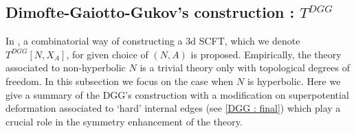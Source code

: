 \documentclass[a4paper,11pt]{article}
\begin{document}
\subsection{Dimofte-Gaiotto-Gukov's construction : $T^{DGG}$}\label{sec:DGG}
In \cite{Dimofte:2011ju}, a combinatorial way of constructing a 3d SCFT, which we denote $T^{DGG}[N,X_A]$, for given choice of $(N,A)$ is proposed. Empirically, the theory associated to non-hyperbolic $N$ is a trivial theory only with topological degrees of freedom.  In this subsection we focus on the case when $N$ is hyperbolic. Here we give a  summary of the DGG's construction with a modification on superpotential deformation associated to  `hard' internal edges (see \eqref{DGG : final}) which play a crucial role in the symmetry enhancement of the theory. 
\end{document}
